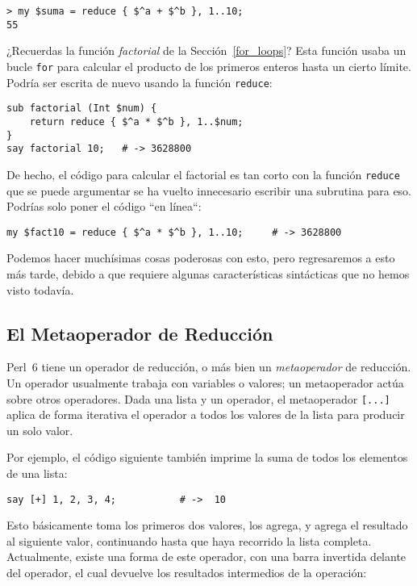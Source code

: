 \begin{verbatim}
> my $suma = reduce { $^a + $^b }, 1..10;
55
\end{verbatim}

¿Recuerdas la función \emph{factorial} de la Sección~\ref{for_loops}?
Esta función usaba un bucle {\tt for} para calcular el producto de los
primeros enteros hasta un cierto límite. Podría ser escrita de nuevo 
usando la función {\tt reduce}:

\begin{verbatim}
sub factorial (Int $num) { 
    return reduce { $^a * $^b }, 1..$num;
}
say factorial 10;   # -> 3628800
\end{verbatim}
%
De hecho, el código para calcular el factorial es tan corto
con la función {\tt reduce} que se puede argumentar se ha vuelto
innecesario escribir una subrutina para eso. Podrías solo
poner el código ``en línea``:

\begin{verbatim}
my $fact10 = reduce { $^a * $^b }, 1..10;     # -> 3628800
\end{verbatim}
%

Podemos hacer muchísimas cosas poderosas con esto, pero regresaremos
a esto más tarde, debido a que requiere algunas características 
sintácticas que no hemos visto todavía.

\subsection{El Metaoperador de Reducción}

Perl~6 tiene un operador de reducción, o más bien 
un \emph{metaoperador} de reducción. Un operador usualmente
trabaja con variables o valores; un metaoperador actúa sobre 
otros operadores. Dada una lista y un operador, el metaoperador
\verb|[...]| aplica de forma iterativa el operador 
a todos los valores de la lista para producir un solo
valor.

Por ejemplo, el código siguiente también imprime la suma de todos
los elementos de una lista:

\begin{verbatim}
say [+] 1, 2, 3, 4;           # ->  10
\end{verbatim}

Esto básicamente toma los primeros dos valores, los agrega,
y agrega el resultado al siguiente valor, continuando 
hasta que haya recorrido la lista completa. Actualmente,
existe una forma de este operador, con una barra invertida 
delante del operador, el cual devuelve los resultados 
intermedios de la operación:


